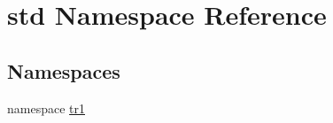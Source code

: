 \hypertarget{namespacestd}{\section{std \-Namespace \-Reference}
\label{d8/dcc/namespacestd}
}
\subsection*{\-Namespaces}
\begin{DoxyCompactItemize}
\item 
namespace \hyperlink{namespacestd_1_1tr1}{tr1}
\end{DoxyCompactItemize}
